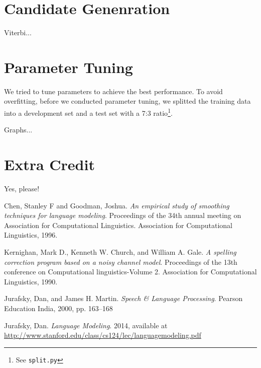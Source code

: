 \documentclass{article}
\begin{document}
\section{Candidate Genenration}

Viterbi...

\section{Parameter Tuning}

We tried to tune parameters to achieve the best performance. To avoid overfitting, before we conducted parameter tuning, we splitted the training data into a development set and a test set with a 7:3 ratio\footnote{See \texttt{split.py}}.

Graphs...

\section{Extra Credit}

Yes, please!

\begin{thebibliography}{9}

    Chen, Stanley F and Goodman, Joshua.
    \emph{An empirical study of smoothing techniques for language modeling}.
    Proceedings of the 34th annual meeting on Association for Computational Linguistics. Association for Computational Linguistics, 1996.

    Kernighan, Mark D., Kenneth W. Church, and William A. Gale.
    \emph{A spelling correction program based on a noisy channel model}.
    Proceedings of the 13th conference on Computational linguistics-Volume 2. Association for Computational Linguistics, 1990.

    Jurafsky, Dan, and James H. Martin.
    \emph{Speech \& Language Processing}.
    Pearson Education India, 2000, pp. 163--168

    Jurafsky, Dan.
    \emph{Language Modeling}.
    2014, available at \url{http://www.stanford.edu/class/cs124/lec/languagemodeling.pdf}
\end{thebibliography}
\end{document}
